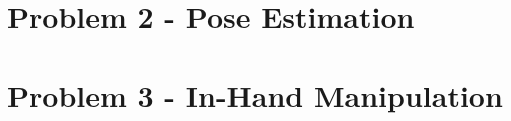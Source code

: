 %  








































\section{Problem 2 - Pose Estimation} \label{sec:lit-rev-problem-2}

\section{Problem 3 - In-Hand Manipulation} \label{sec:lit-rev-problem-3}